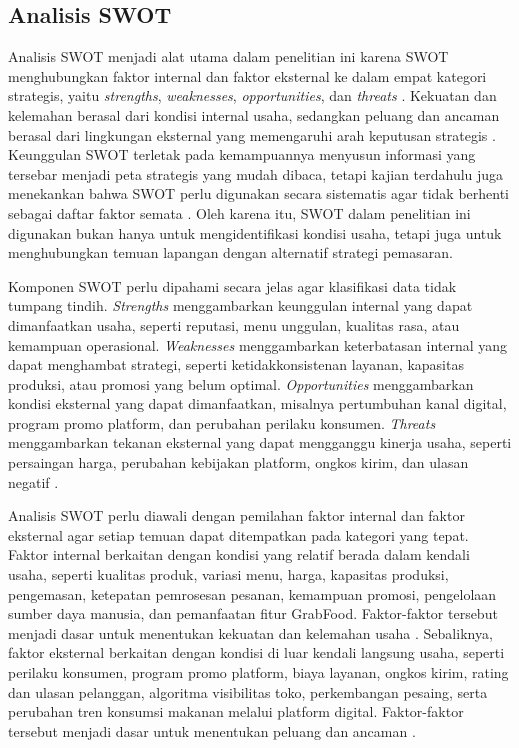 \subsection{Analisis SWOT}

Analisis SWOT menjadi alat utama dalam penelitian ini karena SWOT menghubungkan faktor internal dan faktor eksternal ke dalam empat kategori strategis, yaitu \textit{strengths}, \textit{weaknesses}, \textit{opportunities}, dan \textit{threats} \parencite{helms2010swotreview,gurel2017swot}. Kekuatan dan kelemahan berasal dari kondisi internal usaha, sedangkan peluang dan ancaman berasal dari lingkungan eksternal yang memengaruhi arah keputusan strategis \parencite{david2023strategicmanagement,gurel2017swot}. Keunggulan SWOT terletak pada kemampuannya menyusun informasi yang tersebar menjadi peta strategis yang mudah dibaca, tetapi kajian terdahulu juga menekankan bahwa SWOT perlu digunakan secara sistematis agar tidak berhenti sebagai daftar faktor semata \parencite{helms2010swotreview,david2023strategicmanagement}. Oleh karena itu, SWOT dalam penelitian ini digunakan bukan hanya untuk mengidentifikasi kondisi usaha, tetapi juga untuk menghubungkan temuan lapangan dengan alternatif strategi pemasaran.

Komponen SWOT perlu dipahami secara jelas agar klasifikasi data tidak tumpang tindih. \textit{Strengths} menggambarkan keunggulan internal yang dapat dimanfaatkan usaha, seperti reputasi, menu unggulan, kualitas rasa, atau kemampuan operasional. \textit{Weaknesses} menggambarkan keterbatasan internal yang dapat menghambat strategi, seperti ketidakkonsistenan layanan, kapasitas produksi, atau promosi yang belum optimal. \textit{Opportunities} menggambarkan kondisi eksternal yang dapat dimanfaatkan, misalnya pertumbuhan kanal digital, program promo platform, dan perubahan perilaku konsumen. \textit{Threats} menggambarkan tekanan eksternal yang dapat mengganggu kinerja usaha, seperti persaingan harga, perubahan kebijakan platform, ongkos kirim, dan ulasan negatif \parencite{rangkuti2016analisisSWOT,gurel2017swot,ramadhanti2023rucika}.

Analisis SWOT perlu diawali dengan pemilahan faktor internal dan faktor eksternal agar setiap temuan dapat ditempatkan pada kategori yang tepat. Faktor internal berkaitan dengan kondisi yang relatif berada dalam kendali usaha, seperti kualitas produk, variasi menu, harga, kapasitas produksi, pengemasan, ketepatan pemrosesan pesanan, kemampuan promosi, pengelolaan sumber daya manusia, dan pemanfaatan fitur GrabFood. Faktor-faktor tersebut menjadi dasar untuk menentukan kekuatan dan kelemahan usaha \parencite{david2023strategicmanagement,rangkuti2016analisisSWOT}. Sebaliknya, faktor eksternal berkaitan dengan kondisi di luar kendali langsung usaha, seperti perilaku konsumen, program promo platform, biaya layanan, ongkos kirim, rating dan ulasan pelanggan, algoritma visibilitas toko, perkembangan pesaing, serta perubahan tren konsumsi makanan melalui platform digital. Faktor-faktor tersebut menjadi dasar untuk menentukan peluang dan ancaman \parencite{gurel2017swot,khairani2022buahsayur,ruhiyat2023minatbeli}.

